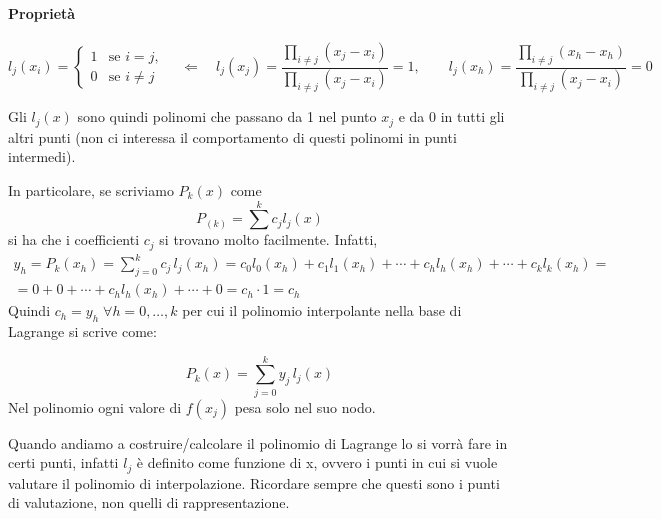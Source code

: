 \documentclass[12pt,a4paper,]{report}
\begin{document}
\paragraph{Proprietà}
\[
l_j(x_i) =
\begin{cases}
1 & \text{se } i = j, \\
0 & \text{se } i \neq j
\end{cases}
\quad \Leftarrow \quad
l_j(x_j)
= \frac{\prod_{i \neq j} (x_j - x_i)}{\prod_{i \neq j} (x_j - x_i)} = 1,
\qquad
l_j(x_h)
= \frac{\prod_{i \neq j} (x_h - x_h)}{\prod_{i \neq j} (x_j - x_i)} = 0
\]
\begin{nota}
    Gli $l_j(x)$ sono quindi polinomi che passano da 1 nel punto $x_j$ e da 0 in tutti gli altri punti (non ci interessa il comportamento di questi polinomi in punti intermedi).
\end{nota}
\noindent
In particolare, se scriviamo $P_k(x)$ come
\[
P_{(k)} = \sum^k c_j l_j(x)
\]
si ha che i coefficienti $c_j$ si trovano molto facilmente.
Infatti,
\[
\begin{aligned}
y_h = P_k(x_h)
= \sum_{j=0}^{k} c_j \, l_j(x_h)
= c_0 l_0(x_h) + c_1 l_1(x_h) + \cdots + c_h l_h(x_h) + \cdots + c_k l_k(x_h) =\\
= 0 + 0 + \cdots + c_h l_h(x_h) + \cdots + 0
= c_h \cdot 1 = c_h
\end{aligned}
\]
Quindi
$
c_h = y_h \; 
\forall h = 0, \ldots, k
$ per cui il polinomio interpolante nella base di Lagrange si scrive come:
\begin{definizione}
    \label{def: polinomio interpolante di Lagrange}
    \[
    P_k(x) = \sum_{j=0}^{k} y_j \, l_j(x)
    \]
    Nel polinomio ogni valore di $f(x_j)$ pesa solo nel suo nodo.
\end{definizione}
\begin{nota}
    Quando andiamo a costruire/calcolare il polinomio di Lagrange lo si vorrà fare in certi punti, infatti $l_j$ è definito come funzione di x, ovvero i punti in cui si vuole valutare il polinomio di interpolazione.
    Ricordare sempre che questi sono i punti di valutazione, non quelli di rappresentazione.
\end{nota}
\end{document}
